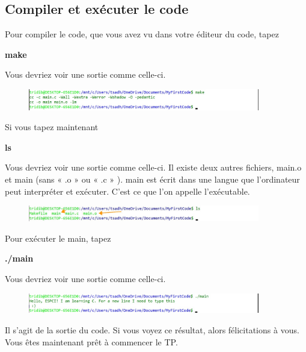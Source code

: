 \documentclass{article}
\begin{document}
\subsection{Compiler et exécuter le code}
Pour compiler le code, que vous avez vu dans votre éditeur du code, tapez
\begin{tcolorbox}[width=\textwidth,colframe=BurntOrange,colback={black},title={ubuntu terminal},outer arc=0mm,colupper=white]   
      \large\textbf{  make }
\end{tcolorbox}

Vous devriez voir une sortie comme celle-ci.
\begin{figure}[H]
\center
\includegraphics[width=0.9\textwidth]{Plots/FirstCode_6.jpeg}
\end{figure}
Si vous tapez maintenant 
\begin{tcolorbox}[width=\textwidth,colframe=BurntOrange,colback={black},title={ubuntu terminal},outer arc=0mm,colupper=white] 
      \large\textbf{  ls }
\end{tcolorbox}
Vous devriez voir une sortie comme celle-ci. Il existe deux autres fichiers, main.o et main (sans « .o » ou « .c » ). main est écrit dans une langue que l'ordinateur peut interpréter et exécuter. C'est ce que l'on appelle l'exécutable.
 \begin{figure}[H]
\center
\includegraphics[width=0.9\textwidth]{Plots/FirstCode_7.jpeg}
\end{figure}
Pour exécuter le main, tapez
\begin{tcolorbox}[width=\textwidth,colframe=BurntOrange,colback={black},title={ubuntu terminal},outer arc=0mm,colupper=white]  
      \large\textbf{  ./main }
\end{tcolorbox}
Vous devriez voir une sortie comme celle-ci. 
\begin{figure}[H]
\center
\includegraphics[width=0.9\textwidth]{Plots/FirstCode_8.jpeg}
\end{figure}
Il s'agit de la sortie du code. Si vous voyez ce résultat, alors félicitations à vous. Vous êtes maintenant prêt à commencer le TP.
\end{document}
